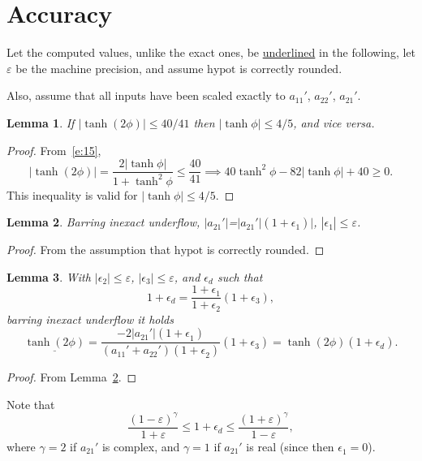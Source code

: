 \documentclass[a4paper,12pt,twoside]{article}
\newtheorem{lem}{Lemma}
\begin{document}
\section{Accuracy}
Let the computed values, unlike the exact ones, be
\underline{underlined} in the following, let $\varepsilon$ be the
machine precision, and assume $\mathrm{hypot}$ is correctly rounded.

Also, assume that all inputs have been scaled exactly to $a_{11}'$,
$a_{22}'$, $a_{21}'$.

\begin{lem}\label{l:1}
  If $|\tanh(2\phi)|\le 40/41$ then $|\tanh\phi|\le 4/5$, and vice
  versa.
\end{lem}
\begin{proof}
  From~\eqref{e:15},
  \begin{displaymath}
    |\tanh(2\phi)|=\frac{2|\tanh\phi|}{1+\tanh^2\phi}\le\frac{40}{41}\implies
    40\tanh^2\phi-82|\tanh\phi|+40\ge 0.
  \end{displaymath}
  This inequality is valid for $|\tanh\phi|\le 4/5$.
\end{proof}

\begin{lem}\label{l:2}
  Barring inexact underflow,
  \underline{$|a_{21}'|$}=$|a_{21}'|(1+\epsilon_1^{})|$,
  $|\epsilon_1^{}|\le\varepsilon$.
\end{lem}
\begin{proof}
  From the assumption that $\mathrm{hypot}$ is correctly rounded.
\end{proof}

\begin{lem}\label{l:3}
  With $|\epsilon_2|\le\varepsilon$, $|\epsilon_3|\le\varepsilon$, and
  $\epsilon_d$ such that
  \begin{equation}
    1+\epsilon_d=\frac{1+\epsilon_1}{1+\epsilon_2}(1+\epsilon_3),
    \label{e:21}
  \end{equation}
  barring inexact underflow it holds
  \begin{displaymath}
    \underline{\tanh(2\phi)}=\frac{-2|a_{21}'|(1+\epsilon_1^{})}{(a_{11}'+a_{22}')(1+\epsilon_2^{})}(1+\epsilon_3^{})=\tanh(2\phi)(1+\epsilon_d^{}).
  \end{displaymath}
\end{lem}
\begin{proof}
  From Lemma~\ref{l:2}.
\end{proof}
Note that
\begin{equation}
  \frac{(1-\varepsilon)^{\gamma}}{1+\varepsilon}\le 1+\epsilon_d\le\frac{(1+\varepsilon)^{\gamma}}{1-\varepsilon},
  \label{e:22}
\end{equation}
where $\gamma=2$ if $a_{21}'$ is complex, and $\gamma=1$ if
$a_{21}'$ is real (since then $\epsilon_1^{}=0$).
\end{document}
